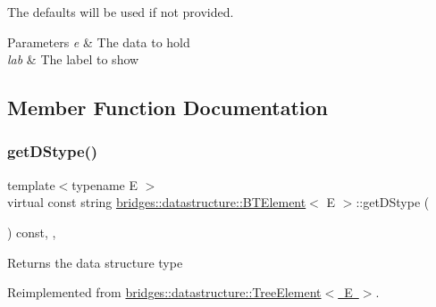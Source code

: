 The defaults will be used if not provided.


\begin{DoxyParams}{Parameters}
{\em e} & The data to hold \\
\hline
{\em lab} & The label to show \\
\hline
\end{DoxyParams}


\subsection{Member Function Documentation}
\mbox{\label{classbridges_1_1datastructure_1_1_b_t_element_a2118b6b74f3fe0fec39e3b258a7dee89}} 
\subsubsection{\texorpdfstring{get\+D\+Stype()}{getDStype()}}
{\footnotesize\ttfamily template$<$typename E $>$ \\
virtual const string \mbox{\hyperlink{classbridges_1_1datastructure_1_1_b_t_element}{bridges\+::datastructure\+::\+B\+T\+Element}}$<$ E $>$\+::get\+D\+Stype (\begin{DoxyParamCaption}{ }\end{DoxyParamCaption}) const\hspace{0.3cm}{\ttfamily [inline]}, {\ttfamily [override]}, {\ttfamily [virtual]}}

\begin{DoxyReturn}{Returns}
the data structure type 
\end{DoxyReturn}


Reimplemented from \mbox{\hyperlink{classbridges_1_1datastructure_1_1_tree_element_a897f34ea284da45e1dc869c3e3b6c9a4}{bridges\+::datastructure\+::\+Tree\+Element$<$ E $>$}}.

\mbox{\label{classbridges_1_1datastructure_1_1_b_t_element_aaa551a4f24bb7ed63fd39e9c4153402b}} 

